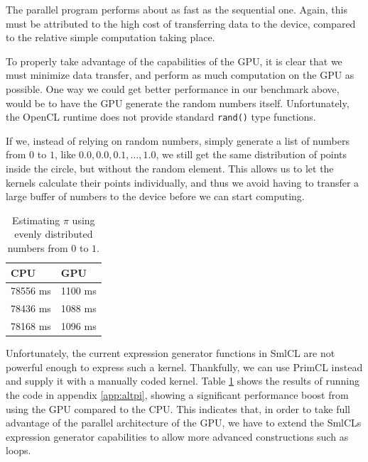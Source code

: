The parallel program performs about as fast as the sequential
one. Again, this must be attributed to the high cost of transferring
data to the device, compared to the relative simple computation
taking place.

To properly take advantage of the capabilities of the GPU, it is clear
that we must minimize data transfer, and perform as much computation
on the GPU as possible. One way we could get better performance in our
benchmark above, would be to have the GPU generate the random numbers
itself. Unfortunately, the OpenCL runtime does not provide standard
\texttt{rand()} type functions. 

If we, instead of relying on random numbers, simply generate a list of
numbers from $0$ to $1$, like $0.0, 0.0, 0.1, \ldots, 1.0$, we still
get the same distribution of points inside the circle, but without the
random element. This allows us to let the kernels calculate their
points individually, and thus we avoid having to transfer a large
buffer of numbers to the device before we can start computing.

\begin{table}
  \center
  \label{table:altpi}
  \begin{tabular}{l|l}
    CPU & GPU \\ \hline
    78556 ms & 1100 ms \\ \hline
    78436 ms & 1088 ms \\ \hline
    78168 ms & 1096 ms \\ \hline
  \end{tabular}
  \caption{Estimating $\pi$ using evenly distributed
    numbers from $0$ to $1$.}
\end{table}

Unfortunately, the current expression generator functions in SmlCL are
not powerful enough to express such a kernel. Thankfully, we can use
PrimCL instead and supply it with a manually coded kernel. Table
\ref{table:altpi} shows the results of running the code in appendix
\ref{app:altpi}, showing a significant performance boost from using
the GPU compared to the CPU. This indicates that, in order to take
full advantage of the parallel architecture of the GPU, we have to
extend the SmlCLs expression generator capabilities to allow more
advanced constructions such as loops.
